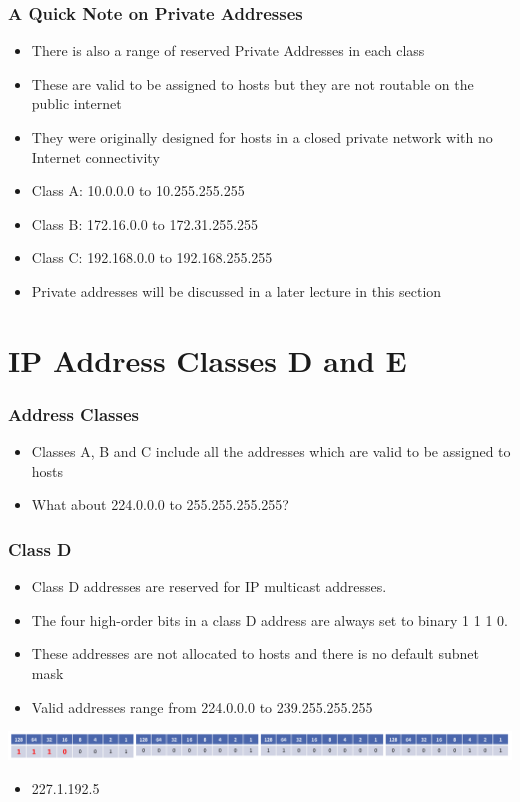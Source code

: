 \documentclass[pdflatex,compress]{beamer}
\begin{document}
\begin{frame}
	\frametitle{A Quick Note on Private Addresses}
	\begin{itemize}
		\item There is also a range of reserved Private Addresses in each class
		\item These are valid to be assigned to hosts but they are not routable on the public internet
		\item They were originally designed for hosts in a closed private network with no Internet connectivity
		\item Class A: 10.0.0.0 to 10.255.255.255
		\item Class B: 172.16.0.0 to 172.31.255.255
		\item Class C: 192.168.0.0 to 192.168.255.255
		\item Private addresses will be discussed in a later lecture in this section
	\end{itemize}
\end{frame}

\section{IP Address Classes D and E}

\begin{frame}
	\frametitle{Address Classes}
	\begin{itemize}
		\item Classes A, B and C include all the addresses which are valid to be assigned to hosts
		\item What about 224.0.0.0 to 255.255.255.255?
	\end{itemize}
\end{frame}

\begin{frame}
	\frametitle{Class D}
	\begin{itemize}
		\item Class D addresses are reserved for IP multicast addresses.
		\item The four high-order bits in a class D address are always set to binary 1 1 1 0.
		\item These addresses are not allocated to hosts and there is no default subnet mask
		\item Valid addresses range from 224.0.0.0 to 239.255.255.255
	\end{itemize}
	\begin{center}
		\includegraphics[width=1\linewidth]{img/img07}
	\end{center}
	\begin{itemize}
		\item 227.1.192.5
	\end{itemize}
\end{frame}
\end{document}
